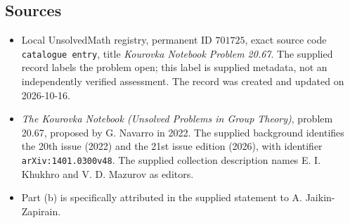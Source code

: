 \documentclass[11pt]{article}
\begin{document}
\subsection{Sources}
\begin{itemize}
\item Local UnsolvedMath registry, permanent ID \(701725\), exact source code \texttt{catalogue entry}, title \emph{Kourovka Notebook Problem 20.67}. The supplied record labels the problem open; this label is supplied metadata, not an independently verified assessment. The record was created and updated on 2026-10-16.
\item \emph{The Kourovka Notebook (Unsolved Problems in Group Theory)}, problem 20.67, proposed by G. Navarro in 2022. The supplied background identifies the 20th issue (2022) and the 21st issue edition (2026), with identifier \texttt{arXiv:1401.0300v48}. The supplied collection description names E. I. Khukhro and V. D. Mazurov as editors.
\item Part (b) is specifically attributed in the supplied statement to A. Jaikin-Zapirain.
\end{itemize}
\end{document}
